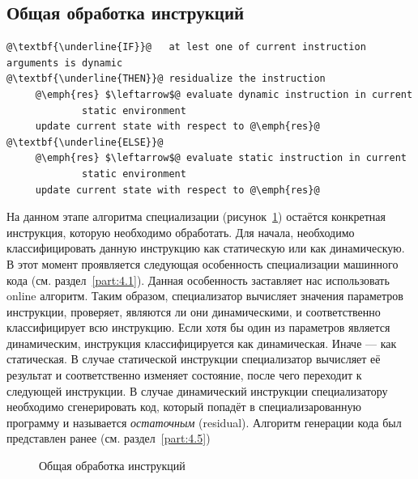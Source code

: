 \subsection{Общая обработка инструкций}
\newsavebox\boxminusone
\begin{lrbox}{\boxminusone}
\begin{lstlisting}[xleftmargin = 20pt]
@\textbf{\underline{IF}}@   at lest one of current instruction arguments is dynamic
@\textbf{\underline{THEN}}@ residualize the instruction
     @\emph{res} $\leftarrow$@ evaluate dynamic instruction in current
             static environment
     update current state with respect to @\emph{res}@
@\textbf{\underline{ELSE}}@
     @\emph{res} $\leftarrow$@ evaluate static instruction in current
             static environment
     update current state with respect to @\emph{res}@
\end{lstlisting}
\end{lrbox}
На данном этапе алгоритма специализации (рисунок~\ref{fig:handle}) остаётся конкретная инструкция, которую необходимо обработать. Для начала, необходимо классифицировать данную инструкцию как статическую или как динамическую.
В этот момент проявляется следующая особенность специализации машинного кода (см. раздел~\ref{part:4.1}).
Данная особенность заставляет нас использовать online алгоритм. Таким образом, специализатор вычисляет значения параметров инструкции, проверяет, являются ли они динамическими, и соответственно классифицирует всю инструкцию. Если хотя бы один из параметров является динамическим, инструкция классифицируется как динамическая. Иначе --- как статическая.
В случае статической инструкции специализатор вычисляет её результат и соответственно изменяет состояние, после чего переходит к следующей инструкции.
В случае динамический инструкции специализатору необходимо сгенерировать код, который попадёт в специализарованную программу и называется
\emph{остаточным} (residual).
Алгоритм генерации кода был представлен ранее (см. раздел~\ref{part:4.5})
\begin{figure}[!t]
\centering
\subfloat{\usebox\boxminusone}
\caption{Общая обработка инструкций\label{fig:handle}}
\end{figure}

